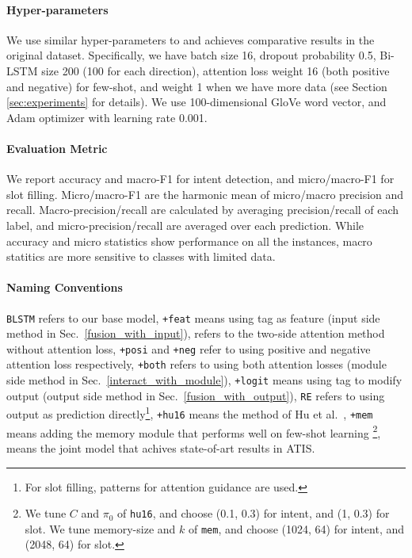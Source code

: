 \paragraph{Hyper-parameters}
We use similar hyper-parameters to \cite{liu2016attention} and achieves comparative results in the original dataset. Specifically, we have batch size 16, dropout probability 0.5, Bi-LSTM size 200 (100 for each direction), attention loss weight 16 (both positive and negative) for few-shot, and weight 1 when we have more data (see Section \ref{sec:experiments} for details). We use 100-dimensional GloVe \cite{pennington2014glove} word vector, and Adam optimizer \cite{kingma2014adam} with learning rate 0.001.

\paragraph{Evaluation Metric}
We report accuracy and macro-F1 for intent detection, and micro/macro-F1 for slot filling.
Micro/macro-F1 are the harmonic mean of micro/macro precision and recall.
Macro-precision/recall are calculated by averaging precision/recall of each label, and micro-precision/recall are averaged over each prediction.
While accuracy and micro statistics show performance on all the instances, macro statitics are more sensitive to classes with limited data.

\paragraph{Naming Conventions}
\texttt{BLSTM} refers to our base model,
\texttt{+feat} means using \RE tag as feature (input side method in Sec.~\ref{fusion_with_input}),
\ptatt refers to the two-side attention method without attention loss,
\texttt{+posi} and \texttt{+neg} refer to using positive and negative attention loss respectively, \texttt{+both} refers to using both attention losses (\NN module side method in Sec.~\ref{interact_with_module}),
\texttt{+logit} means using \RE tag to modify \NN output (output side method in Sec.~\ref{fusion_with_output}),
\texttt{RE} refers to using \RE output as prediction directly\footnote{
For slot filling, patterns for attention guidance are used.},
\texttt{+hu16} means the method of Hu et al.~,
\texttt{+mem} means adding the memory module that performs well on few-shot learning \cite{kaiser2017learning}\footnote{
We tune $C$ and $\pi_0$ of \texttt{hu16}, and choose (0.1, 0.3) for intent, and (1, 0.3) for slot. We tune memory-size and $k$ of \texttt{mem}, and choose (1024, 64) for intent, and (2048, 64) for slot.
},
\LL means the joint model \cite{liu2016attention} that achives state-of-art results in ATIS.
